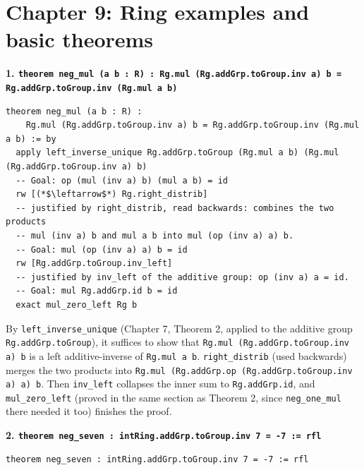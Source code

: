 \section{Chapter 9: Ring examples and basic theorems}\label{sec:14-appendix-solutions:08-chapter-9:1}

\textbf{1. \texttt{theorem neg\_\allowbreak{}mul (a b : R) : Rg.mul (Rg.addGrp.toGroup.inv a) b = Rg.addGrp.toGroup.inv (Rg.mul a b)}}

\begin{lstlisting}
theorem neg_mul (a b : R) :
    Rg.mul (Rg.addGrp.toGroup.inv a) b = Rg.addGrp.toGroup.inv (Rg.mul a b) := by
  apply left_inverse_unique Rg.addGrp.toGroup (Rg.mul a b) (Rg.mul (Rg.addGrp.toGroup.inv a) b)
  -- Goal: op (mul (inv a) b) (mul a b) = id
  rw [(*$\leftarrow$*) Rg.right_distrib]
  -- justified by right_distrib, read backwards: combines the two products
  -- mul (inv a) b and mul a b into mul (op (inv a) a) b.
  -- Goal: mul (op (inv a) a) b = id
  rw [Rg.addGrp.toGroup.inv_left]
  -- justified by inv_left of the additive group: op (inv a) a = id.
  -- Goal: mul Rg.addGrp.id b = id
  exact mul_zero_left Rg b
\end{lstlisting}

By \texttt{left\_\allowbreak{}inverse\_\allowbreak{}unique} (Chapter 7, Theorem 2, applied to the additive group \texttt{Rg.addGrp.toGroup}), it suffices to show that \texttt{Rg.mul (Rg.addGrp.toGroup.inv a) b} is a left additive-inverse of \texttt{Rg.mul a b}. \texttt{right\_\allowbreak{}distrib} (used backwards) merges the two products into \texttt{Rg.mul (Rg.addGrp.op (Rg.addGrp.toGroup.inv a) a) b}. Then \texttt{inv\_\allowbreak{}left} collapses the inner sum to \texttt{Rg.addGrp.id}, and \texttt{mul\_\allowbreak{}zero\_\allowbreak{}left} (proved in the same section as Theorem 2, since \texttt{neg\_\allowbreak{}one\_\allowbreak{}mul} there needed it too) finishes the proof.

\textbf{2. \texttt{theorem neg\_\allowbreak{}seven : intRing.addGrp.toGroup.inv 7 = -\allowbreak{}7 := rfl}}

\begin{lstlisting}
theorem neg_seven : intRing.addGrp.toGroup.inv 7 = -7 := rfl
\end{lstlisting}

